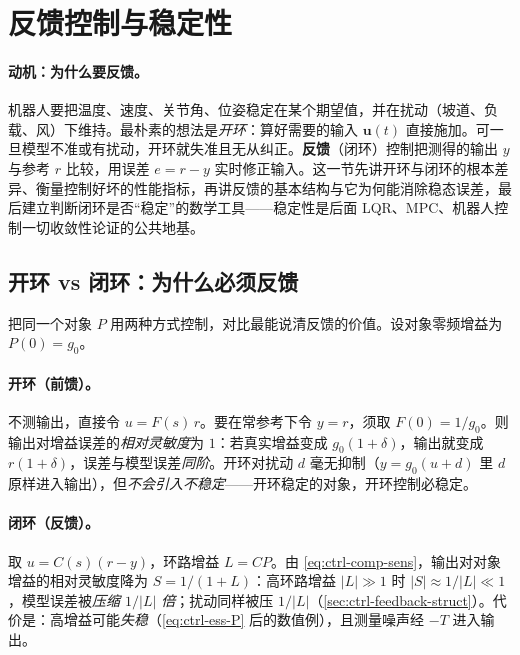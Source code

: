 \section{反馈控制与稳定性}
\label{sec:ctrl-feedback}

\paragraph{动机：为什么要反馈。}
机器人要把温度、速度、关节角、位姿稳定在某个期望值，并在扰动（坡道、负载、风）下维持。最朴素的想法是\emph{开环}：算好需要的输入 $\mathbf{u}(t)$ 直接施加。可一旦模型不准或有扰动，开环就失准且无从纠正。\textbf{反馈}（闭环）控制把测得的输出 $y$ 与参考 $r$ 比较，用误差 $e=r-y$ 实时修正输入。这一节先讲开环与闭环的根本差异、衡量控制好坏的性能指标，再讲反馈的基本结构与它为何能消除稳态误差，最后建立判断闭环是否“稳定”的数学工具——稳定性是后面 LQR、MPC、机器人控制一切收敛性论证的公共地基。

\subsection{开环 vs 闭环：为什么必须反馈}
\label{sec:ctrl-open-vs-closed}

把同一个对象 $P$ 用两种方式控制，对比最能说清反馈的价值\cite{astrom2008feedback}。设对象零频增益为 $P(0)=g_0$。

\paragraph{开环（前馈）。}
不测输出，直接令 $u=F(s)\,r$。要在常参考下令 $y=r$，须取 $F(0)=1/g_0$。则输出对增益误差的\emph{相对灵敏度}为 $1$：若真实增益变成 $g_0(1+\delta)$，输出就变成 $r(1+\delta)$，误差与模型误差\emph{同阶}。开环对扰动 $d$ 毫无抑制（$y=g_0(u+d)$ 里 $d$ 原样进入输出），但\emph{不会引入不稳定}——开环稳定的对象，开环控制必稳定。

\paragraph{闭环（反馈）。}
取 $u=C(s)(r-y)$，环路增益 $L=CP$。由 \cref{eq:ctrl-comp-sens}，输出对对象增益的相对灵敏度降为 $S=1/(1+L)$：高环路增益 $|L|\gg1$ 时 $|S|\approx1/|L|\ll1$，模型误差被\emph{压缩 $1/|L|$ 倍}；扰动同样被压 $1/|L|$（\cref{sec:ctrl-feedback-struct}）。代价是：高增益可能\emph{失稳}（\cref{eq:ctrl-ess-P} 后的数值例），且测量噪声经 $-T$ 进入输出。

